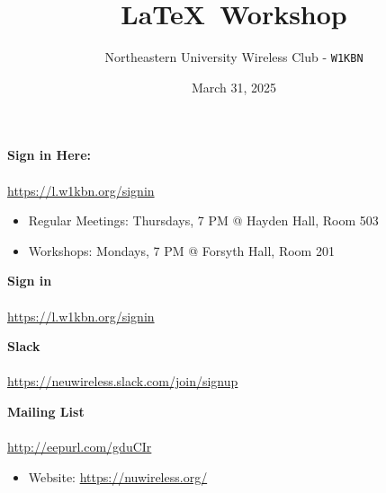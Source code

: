 \documentclass[x11names]{beamer} %
\title{\LaTeX\ Workshop}
\author{Northeastern University Wireless Club - \large\texttt{W1KBN}}
\date{March 31, 2025}
\begin{document}
\begin{frame}
  \titlepage
  \vspace{-1cm}
  \begin{center}
    \textbf{Sign in Here:} \\
     \\
    {\small \url{https://l.w1kbn.org/signin}}
  \end{center}
\end{frame}

\begin{frame}
  \begin{tcolorbox}[colframe=black, colback=blue!10, title=About, center title]
    \begin{itemize}
      \item Regular Meetings: Thursdays, 7 PM @ Hayden Hall, Room 503
      \item Workshops: Mondays, 7 PM @ Forsyth Hall, Room 201
    \end{itemize}        
  \end{tcolorbox}

  \begin{tcolorbox}[colframe=black, colback=blue!10, title=QR Codes \& Links, center title]
    \begin{minipage}{0.32\textwidth}
      \centering
      \textbf{Sign in} \\
       \\
      \tiny \url{https://l.w1kbn.org/signin}
    \end{minipage}
    \begin{minipage}{0.32\textwidth}
      \centering
      \textbf{Slack} \\
       \\
      \tiny \url{https://neuwireless.slack.com/join/signup}
    \end{minipage}
    \begin{minipage}{0.32\textwidth}
      \centering
      \textbf{Mailing List} \\
       \\
      \tiny \url{http://eepurl.com/gduCIr}
    \end{minipage}
    \begin{itemize}
      \item Website: \url{https://nuwireless.org/}
    \end{itemize}
  \end{tcolorbox}
\end{frame}
\end{document}
